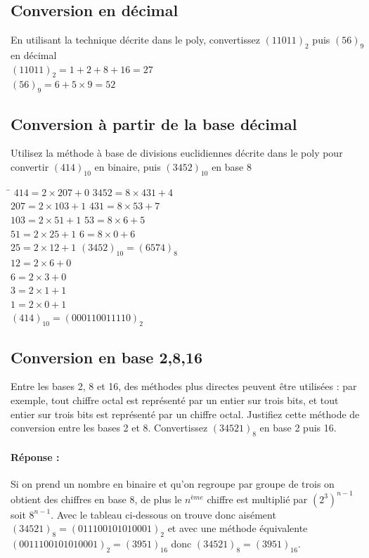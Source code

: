 \documentclass[10pt,a4paper]{article}
\begin{document}
\subsection{Conversion en décimal}
En utilisant la technique décrite dans le poly, convertissez $(11011)_{2}$ puis $(56)_{9}$ en décimal\\
$(11011)_{2} = 1+2+8+16 = 27$\\
$(56)_{9} = 6+5\times 9 = 52$

\subsection{Conversion à partir de la base décimal}
Utilisez la méthode à base de divisions euclidiennes décrite dans le poly pour convertir $(414)_{10}$ en binaire, puis $(3452)_{10}$ en base 8\\
\begin{tabbing}
\hspace{7	cm}\=\kill
 $414 = 2 \times 207 + 0$ \> $3452 = 8 \times 431 + 4$ \\ 
 $207 = 2 \times 103 + 1$ \> $431 = 8 \times 53 + 7$ \\ 
 $103 = 2 \times 51 + 1$ \> $53 = 8 \times 6 + 5$ \\ 
 $51 = 2 \times 25 + 1$ \> $6 = 8 \times 0 + 6$ \\
 $25 = 2 \times 12 + 1$ \> $(3452)_{10} = (6574)_{8}$ \\
 $12 = 2 \times 6 + 0$ \>  \\
 $6 = 2 \times 3 + 0$ \>  \\
 $3 = 2 \times 1 + 1$ \>  \\
 $1 = 2 \times 0 + 1$ \>  \\
 $(414)_{10} = (0001 1001 1110)_{2}$ \>
\end{tabbing} 

\subsection{Conversion en base 2,8,16}
Entre les bases 2, 8 et 16, des méthodes plus directes peuvent être utilisées : par exemple, tout chiffre octal est représenté par un entier sur trois bits, et tout entier sur trois bits est représenté par un chiffre octal. Justifiez cette méthode de conversion entre les bases 2 et 8. Convertissez $(34521)_{8}$ en base 2 puis 16.\\
\paragraph{Réponse :} Si on prend un nombre en binaire et qu'on regroupe par groupe de trois on obtient des chiffres en base 8, de plus le $n^{ème}$ chiffre est multiplié par $(2^{3})^{n-1}$ soit $8^{n-1}$. Avec le tableau ci-dessous on trouve donc aisément $(34521)_{8} = (011 100 101 010 001)_{2}$ et avec une méthode équivalente $(0011 1001 0101 0001)_{2} = (3951)_{16}$ donc $(34521)_{8} = (3951)_{16}$.
\end{document}
